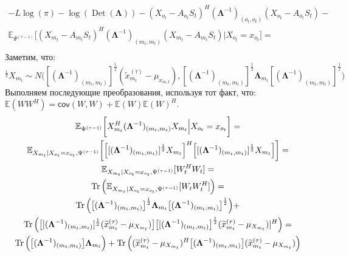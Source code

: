 \documentclass[11pt]{article}
\newcommand{\Expect}{\mathbb{E}}
\newcommand{\Cov}{\mathsf{cov}}
\DeclareMathOperator{\Det}{Det}
\begin{document}
\begin{equation*}
\begin{gathered}
-L \log(\pi) - \log (\Det(\mathbf{\Lambda}))  - (X_{o_t} - A_{o_t}S_t)^H (\mathbf{\Lambda}^{-1})_{(o_t, o_t)} (X_{o_t} - A_{o_t}S_t) - \\ \Expect_{\Psi^{(\tau-1)}} \bigg[ (X_{m_t} - A_{m_t}S_t)^H (\mathbf{\Lambda}^{-1})_{(m_t, m_t)} (X_{m_t} - A_{m_t}S_t) 
\Big|X_{o_t}=x_{o_t}\bigg] = \\
\end{gathered}
\end{equation*}
Заметим, что: 
\begin{equation*}
[(\mathbf{\Lambda}^{-1})_{(m_t, m_t)}]^{\frac{1}{2}}X_{m_t} \sim N\Big([(\mathbf{\Lambda}^{-1})_{(m_t, m_t)}]^{\frac{1}{2}}(\widetilde{x}_{m_t}^{(\tau)} - \mu_{x_{m,t}}),[(\mathbf{\Lambda}^{-1})_{(m_t, m_t)}]^{\frac{1}{2}}\mathbf{\Lambda}_{m_t}[(\mathbf{\Lambda}^{-1})_{(m_t, m_t)}]^{\frac{1}{2}}\Big)
\end{equation*}
Выполняем последующие преобразования, используя тот факт, что: $\Expect(WW^H)=\Cov(W,W)+\Expect(W)\Expect(W)^H$.
\begin{equation*}
\begin{gathered}
\Expect_{\Psi^{(\tau-1)}}\bigg[X_{m_t}^H (\mathbf{\Lambda}^{-1})_{(m_t, m_t)}X_{m_t}   \Big|X_{o_t}=x_{o_t}\bigg] = \\
\Expect_{X_{m_t}|X_{o_t}=x_{o_t}, \Psi^{(\tau-1)}}\bigg[\Big[[(\mathbf{\Lambda}^{-1})_{(m_t, m_t)}]^{\frac{1}{2}}X_{m_t}\Big]^H\Big[[(\mathbf{\Lambda}^{-1})_{(m_t, m_t)}]^{\frac{1}{2}}X_{m_t}\Big]\bigg] = \\
\Expect_{X_{m_t}|X_{o_t}=x_{o_t}, \Psi^{(\tau-1)}}[W_t^HW_t] = \\
\Tr \Big( \Expect_{X_{m_t}|X_{o_t}=x_{o_t}, \Psi^{(\tau-1)}}[W_tW_t^H] \Big) = \\
\Tr \Big( \big[(\mathbf{\Lambda}^{-1})_{(m_t, m_t)}\big]^{\frac{1}{2}}\mathbf{\Lambda}_{m_t}\big[(\mathbf{\Lambda}^{-1})_{(m_t, m_t)}\big]^{\frac{1}{2}} \Big) + \\ \Tr \Big( \big[[(\mathbf{\Lambda}^{-1})_{(m_t, m_t)}]^{\frac{1}{2}}(\widetilde{x}_{m_t}^{(\tau)} - \mu_{X_{m_t}})\big]\big[[(\mathbf{\Lambda}^{-1})_{(m_t, m_t)}\big]^{\frac{1}{2}}(\widetilde{x}_{m_t}^{(\tau)} - \mu_{X_{m_t}})]^H \Big)= \\
\Tr \Big( \big[(\mathbf{\Lambda}^{-1})_{(m_t, m_t)}\big]\mathbf{\Lambda}_{m_t} \Big) + \Tr \Big((\widetilde{x}_{m_t}^{(\tau)} - \mu_{X_{m_t}})^H\big[(\mathbf{\Lambda}^{-1})_{(m_t, m_t)}\big](\widetilde{x}_{m_t}^{(\tau)} - \mu_{X_{m_t}}) \Big) \\
\end{gathered}
\end{equation*}
\end{document}
